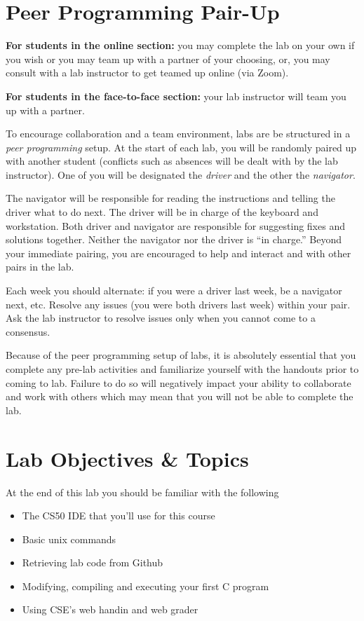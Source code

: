 \documentclass[12pt]{scrartcl}
\begin{document}
\section*{Peer Programming Pair-Up}


\textbf{For students in the online section:} you may complete
the lab on your own if you wish or you may team up with a partner
of your choosing, or, you may consult with a lab instructor to get
teamed up online (via Zoom).

\textbf{For students in the face-to-face section:} your
lab instructor will team you up with a partner.  

To encourage collaboration and a team environment, labs are be
structured in a \emph{peer programming} setup.  At the start of
each lab, you will be randomly paired up with another student 
(conflicts such as absences will be dealt with by the lab instructor).
One of you will be designated the \emph{driver} and the other
the \emph{navigator}.  

The navigator will be responsible for reading the instructions and
telling the driver what to do next.  The driver will be in charge of the
keyboard and workstation.  Both driver and navigator are responsible
for suggesting fixes and solutions together.  Neither the navigator
nor the driver is ``in charge.''  Beyond your immediate pairing, you
are encouraged to help and interact and with other pairs in the lab.

Each week you should alternate: if you were a driver last week, 
be a navigator next, etc.  Resolve any issues (you were both drivers
last week) within your pair.  Ask the lab instructor to resolve issues
only when you cannot come to a consensus.  

Because of the peer programming setup of labs, it is absolutely 
essential that you complete any pre-lab activities and familiarize
yourself with the handouts prior to coming to lab.  Failure to do
so will negatively impact your ability to collaborate and work with 
others which may mean that you will not be able to complete the
lab.  

\section{Lab Objectives \& Topics}
At the end of this lab you should be familiar with the following
\begin{itemize}
  \item The CS50 IDE that you'll use for this course
  \item Basic unix commands
  \item Retrieving lab code from Github
  \item Modifying, compiling and executing your first C program
  \item Using CSE's web handin and web grader
\end{itemize}
\end{document}

